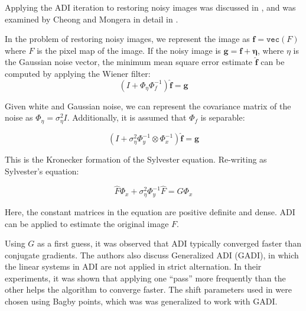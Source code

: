 \documentclass{article}
\begin{document}

Applying the ADI iteration to restoring noisy images was discussed in \cite{Simoncini}, and was examined by Cheong and Mongera in detail in \cite{Calvetti}.

In the problem of restoring noisy images, we represent the image as $\mathbf f = \texttt{vec}( F)$ where $F$ is the pixel map of the image. If the noisy image is $\mathbf g = \mathbf f + \mathbf \eta$, where $\eta$ is the Gaussian noise vector, the minimum mean square error estimate $\hat{\mathbf{f}}$ can be computed by applying the Wiener filter:
\[
(I+\Phi_{\eta} \Phi_{f}^{-1}) \hat{\mathbf{f}}=\mathbf{g}
\]

Given white and Gaussian noise, we can represent the covariance matrix of the noise as $\Phi_{\eta}=\sigma_{\eta}^{2} I$. Additionally, it is assumed that $\Phi _f$ is separable:

\[(I + \sigma_{\eta}^2 \Phi^{-1}_y \otimes \Phi_x^{-1}) \hat {\mathbf f} = \mathbf g\]

This is the Kronecker formation of the Sylvester equation. Re-writing as Sylvester's equation:

\[\hat{F} \Phi_{x}+\sigma_{\eta}^{2} \Phi_{y}^{-1} \hat{F}=G \Phi_{x}\]

Here, the constant matrices in the equation are positive definite and dense. ADI can be applied to estimate the original image $F$.

Using $G$ as a first guess, it was observed that ADI typically converged faster than conjugate gradients. The authors also discuss Generalized ADI (GADI), in which the linear systems in ADI are not applied in strict alternation. In their experiments, it was shown that applying one ``pass'' more frequently than the other helps the algorithm to converge faster. The shift parameters used in \cite{Calvetti} were chosen using Bagby points, which was was generalized to work with GADI.

\end{document}
